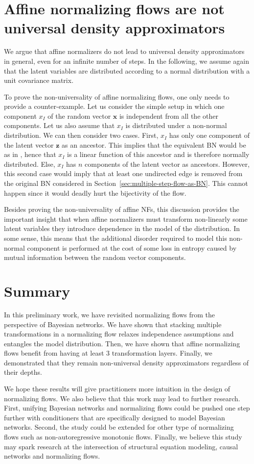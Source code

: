 \section{Affine normalizing flows are not universal density approximators}

We argue that affine normalizers do not lead to universal density approximators in general, even for an infinite number of steps. In the following, we assume again that the latent variables are distributed according to a normal distribution with a unit covariance matrix.


To prove the non-universality of affine normalizing flows, one only needs to provide a counter-example.
Let us consider the simple setup in which one component $x_I$ of the random vector $\mathbf x$ is independent from all the other components.
Let us also assume that $x_I$ is distributed under a non-normal distribution.
We can then consider two cases.
First, $x_I$ has only one component of the latent vector $\mathbf z$ as an ancestor. This implies that the equivalent BN would be as in , hence that $x_I$ is a linear function of this ancestor and is therefore normally distributed.
Else, $x_I$ has $n$ components of the latent vector as ancestors.
However, this second case would imply that at least one undirected edge is removed from the original BN considered in Section~\ref{sec:multiple-step-flow-as-BN}.
This cannot happen since it would deadly hurt the bijectivity of the flow.


Besides proving the non-universality of affine NFs, this discussion provides the important insight that when affine normalizers must transform non-linearly some latent variables they introduce dependence in the model of the distribution. In some sense, this means that the additional disorder required to model this non-normal component is performed at the cost of some loss in entropy caused by mutual information between the random vector components.
\section{Summary}

In this preliminary work, we have revisited normalizing flows from the perspective of Bayesian networks.
We have shown that stacking multiple transformations in a normalizing flow relaxes independence assumptions and entangles the model distribution.
Then, we have shown that affine normalizing flows benefit from having at least 3 transformation layers.
Finally, we demonstrated that they remain non-universal density approximators regardless of their depths.


We hope these results will give practitioners more intuition in the design of normalizing flows.
We also believe that this work may lead to further research.
First, unifying Bayesian networks and normalizing flows could be pushed one step further with conditioners that are specifically designed to model Bayesian networks.
Second, the study could be extended for other type of normalizing flows such as non-autoregressive monotonic flows.
Finally, we believe this study may spark research at the intersection of structural equation modeling, causal networks and normalizing flows.
